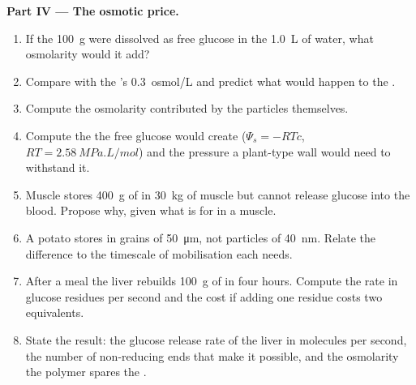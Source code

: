 \begin{problem}
\medskip
\noindent\textbf{Part IV --- The osmotic price.}
\begin{enumerate}[resume]
  \item If the \qty{100}{g} were dissolved as free glucose in the
        \qty{1.0}{L} of  water, what osmolarity would it add?
  \item Compare with the 's \qty{0.3}{osmol/L} and predict what
        would happen to the .
  \item Compute the osmolarity contributed by the  particles
        themselves.
  \item Compute the  the free glucose would create
        ($\Psi_s = -RTc$, $RT = \qty{2.58}{MPa.L/mol}$) and the
        pressure a plant-type wall would need to withstand it.
  \item Muscle stores \qty{400}{g} of  in \qty{30}{kg} of
        muscle but cannot release glucose into the blood. Propose why,
        given what  is for in a muscle.
  \item A potato stores  in grains of \qty{50}{\micro m}, not
         particles of \qty{40}{nm}. Relate the difference to
        the timescale of mobilisation each  needs.
  \item After a meal the liver rebuilds \qty{100}{g} of  in
        four hours. Compute the rate in glucose residues per second and
        the  cost if adding one residue costs two  equivalents.
  \item State the result: the glucose release rate of the liver in
        molecules per second, the number of non-reducing ends that
        make it possible, and the osmolarity the polymer spares the
        .
\end{enumerate}
\end{problem}

